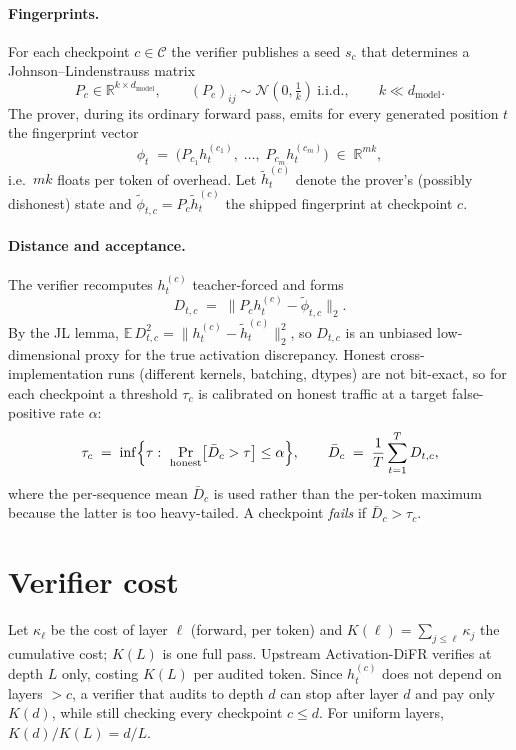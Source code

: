 \documentclass[11pt]{article}
\begin{document}
\paragraph{Fingerprints.}
For each checkpoint $c\in\mathcal{C}$ the verifier publishes a seed $s_c$ that determines a
Johnson--Lindenstrauss matrix
\[
  P_c \in \mathbb{R}^{k\times d_{\mathrm{model}}}, \qquad (P_c)_{ij} \sim \mathcal{N}\!\left(0, \tfrac{1}{k}\right)
  \ \text{i.i.d.},\qquad k \ll d_{\mathrm{model}} .
\]
The prover, during its ordinary forward pass, emits for every generated position $t$ the
fingerprint vector
\[
  \phi_t \;=\; \bigl(P_{c_1} h^{(c_1)}_t,\; \dots,\; P_{c_m} h^{(c_m)}_t\bigr)
  \;\in\; \mathbb{R}^{m k},
\]
i.e.\ $mk$ floats per token of overhead. Let $\tilde h^{(c)}_t$ denote the prover's
(possibly dishonest) state and $\tilde\phi_{t,c} = P_c \tilde h^{(c)}_t$ the shipped
fingerprint at checkpoint $c$.

\paragraph{Distance and acceptance.}
The verifier recomputes $h^{(c)}_t$ teacher-forced and forms
\[
  D_{t,c} \;=\; \bigl\| P_c h^{(c)}_t - \tilde\phi_{t,c} \bigr\|_2 .
\]
By the JL lemma, $\mathbb{E}\,D_{t,c}^2 = \|h^{(c)}_t - \tilde h^{(c)}_t\|_2^2$, so $D_{t,c}$
is an unbiased low-dimensional proxy for the true activation discrepancy. Honest
cross-implementation runs (different kernels, batching, dtypes) are not bit-exact, so for
each checkpoint a threshold $\tau_c$ is calibrated on honest traffic at a target false-positive
rate $\alpha$:
\[
  \tau_c \;=\; \inf\Bigl\{\tau:\ \Pr_{\text{honest}}\bigl[\bar D_c > \tau\bigr] \le \alpha\Bigr\},
  \qquad
  \bar D_c \;=\; \frac{1}{T}\sum_{t=1}^{T} D_{t,c},
\]
where the per-sequence mean $\bar D_c$ is used rather than the per-token maximum
because the latter is too heavy-tailed. A checkpoint \emph{fails} if $\bar D_c > \tau_c$.

\section{Verifier cost}

Let $\kappa_\ell$ be the cost of layer $\ell$ (forward, per token) and
$K(\ell) = \sum_{j\le \ell}\kappa_j$ the cumulative cost; $K(L)$ is one full pass. Upstream
Activation-DiFR verifies at depth $L$ only, costing $K(L)$ per audited token. Since
$h^{(c)}_t$ does not depend on layers $>c$, a verifier that audits to depth $d$ can stop
after layer $d$ and pay only $K(d)$, while still checking every checkpoint $c\le d$.
For uniform layers, $K(d)/K(L) = d/L$.
\end{document}
